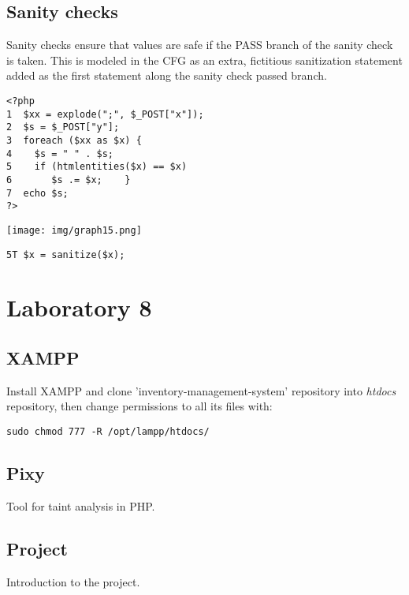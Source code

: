 \documentclass[a4paper, 10pt, titlepage]{article}
\begin{document}
\subsection{Sanity checks}
Sanity checks ensure that values are safe if the PASS branch of the sanity check is taken. This is modeled in the CFG as an extra, fictitious sanitization statement added as the first statement along the sanity check passed branch. \\
\begin{minipage}{0.5\textwidth}
\begin{small}
\begin{lstlisting}
<?php 
1  $xx = explode(";", $_POST["x"]); 
2  $s = $_POST["y"]; 
3  foreach ($xx as $x) { 
4    $s = " " . $s; 
5    if (htmlentities($x) == $x) 
6       $s .= $x;    } 
7  echo $s; 
?>
\end{lstlisting}
\end{small}
\end{minipage}
\hfill\vline\hfill
\begin{minipage}{0.4\textwidth}
\begin{center}
\texttt{[image: img/graph15.png]}
\end{center}
\begin{lstlisting}
5T $x = sanitize($x);
\end{lstlisting}
\end{minipage}

\newpage
\section{Laboratory 8}
\subsection*{XAMPP}
Install XAMPP and clone 'inventory-management-system' repository into \textit{htdocs} repository, then change permissions to all its files with:
\begin{verbatim}
sudo chmod 777 -R /opt/lampp/htdocs/
\end{verbatim}
\subsection*{Pixy}
Tool for taint analysis in PHP.

\subsection*{Project}
Introduction to the project.
\end{document}
